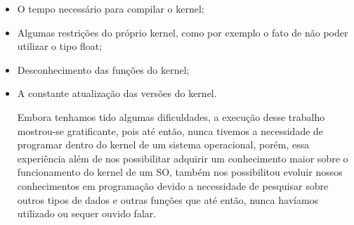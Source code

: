 \documentclass[12pt]{article}
\begin{document}
\begin{itemize}

\item O tempo necessário para compilar o kernel;
\item Algumas restrições do próprio kernel, como por exemplo o fato de não poder utilizar o tipo float;
\item Desconhecimento das funções do kernel;
\item A constante atualização das versões do kernel.

Embora tenhamos tido algumas dificuldades, a execução desse trabalho mostrou-se gratificante, pois até então, nunca tivemos a necessidade de programar dentro do kernel de um sistema operacional, porém, essa experiência além de nos possibilitar adquirir um conhecimento maior sobre o funcionamento do kernel de um SO, também nos possibilitou evoluir nossos conhecimentos em programação devido a necessidade de pesquisar sobre outros tipos de dados e outras funções que até então, nunca havíamos utilizado ou sequer ouvido falar. 

\end{itemize}	
	
 \pagebreak



\end{document}
